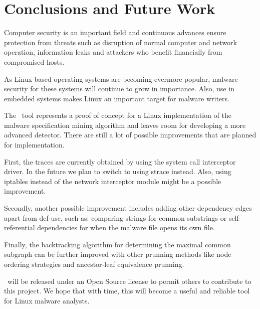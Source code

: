 \chapter{Conclusions and Future Work}
\label{chapter:sixth}

Computer security is an important field and continuous advances ensure protection from threats such as disruption of normal computer and network operation, information leaks and attackers who benefit financially from compromised hosts.

As Linux based operating systems are becoming evermore popular, malware security for these systems will continue to grow in importance. Also, use in embedded systems makes Linux an important target for malware writers.

The \textbf{\project}\ tool represents a proof of concept for a Linux implementation of the malware specification mining algorithm and leaves room for developing a more advanced detector. There are still a lot of possible improvements that are planned for implementation.

First, the traces are currently obtained by using the system call interceptor driver. In the future we plan to switch to using strace instead. Also, using iptables instead of the network interceptor module might be a possible improvement.

Secondly, another possible improvement includes adding other dependency edges apart from def-use, such as: comparing strings for common substrings or self-referential dependencies for when the malware file opens its own file.

Finally, the backtracking algorithm for determining the maximal common subgraph can be further improved with other prunning methods like node ordering strategies and ancestor-leaf equivalence prunning.

\textbf{\project}\ will be released under an Open Source license to permit others to contribute to this project. We hope that with time, this will become a useful and reliable tool for Linux malware analysts.
